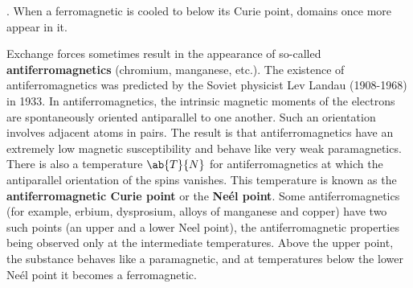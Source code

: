 .
When a ferromagnetic is cooled to below its Curie point, domains once more appear in it.

Exchange forces sometimes result in the appearance of so-called \textbf{antiferromagnetics} (chromium, manganese, etc.).
The existence of antiferromagnetics was predicted by the Soviet physicist Lev Landau (1908-1968) in 1933.
In antiferromagnetics, the intrinsic magnetic moments of the electrons are spontaneously oriented antiparallel to one another.
Such an orientation involves adjacent atoms in
pairs.
The result is that antiferromagnetics have an extremely low magnetic susceptibility and behave like very weak paramagnetics.
There is also a temperature $\ab{T}{N}$ for antiferromagnetics at which the antiparallel orientation of the spins vanishes.
This temperature is known as the \textbf{antiferromagnetic Curie point} or the \textbf{Ne\'el point}.
Some antiferromagnetics (for example, erbium, dysprosium, alloys of manganese and copper) have two such points (an upper and a lower Neel point), the antiferromagnetic properties being observed only at the intermediate temperatures.
Above the upper point, the substance behaves like a paramagnetic, and at temperatures below the lower Ne\'el point it becomes a ferromagnetic.
